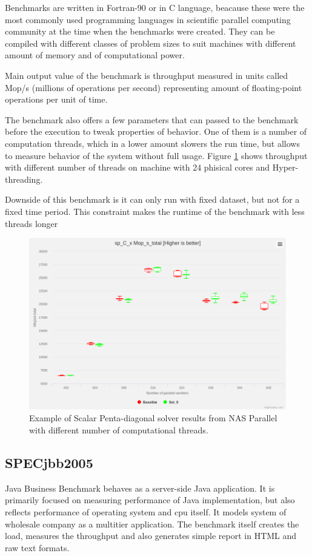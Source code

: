 Benchmarks are written in Fortran-90 or in C language, beacause these were the most
commonly used programming languages in scientific parallel computing community
at the time when the benchmarks were created. They can be compiled with different classes of
problem sizes to suit machines with different amount of memory and of computational
power.

Main output value of the benchmark is throughput measured in units called Mop/s
(millions of operations per second) representing amount of floating-point
operations per unit of time.

The benchmark also offers a few parameters that can passed to the benchmark
before the execution to tweak properties of behavior. One of them is a number of
computation threads, which in a lower amount slowers the run time, but allows to
measure behavior of the system without full usage. Figure \ref{fig:nas} shows
throughput with different number of threads on machine with 24 phisical cores
and Hyper-threading.

Downside of this benchmark is it can only run with fixed dataset, but not for a
fixed time period. This constraint makes the runtime of the benchmark with less threads longer

\begin{figure}
  \centering
  \includegraphics[width=12cm]{obrazky-figures/nas}
  \caption{Example of Scalar Penta-diagonal solver results from NAS Parallel with
    different number of computational threads.}
  \label{fig:nas}
\end{figure}

\subsection{SPECjbb2005}
Java Business Benchmark behaves as a server-side Java application. It is primarily focused on measuring performance of Java implementation, but also reflects performance of operating system and cpu itself.
It models system of wholesale company as a multitier application. The benchmark
itself creates the load, measures the throughput and also generates simple
report in HTML and raw text formats.


